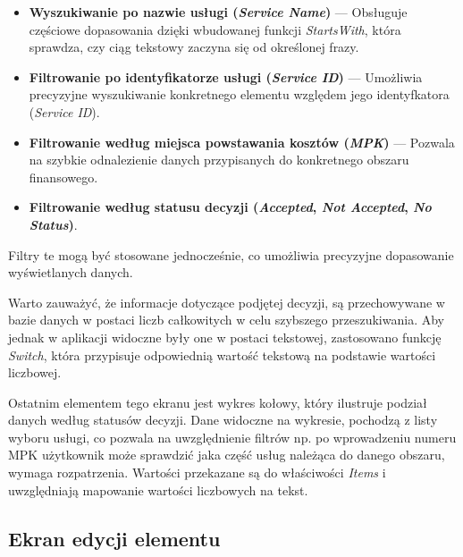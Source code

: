 \begin{itemize}
\item \textbf{Wyszukiwanie po nazwie usługi (\emph{Service Name})} — Obsługuje częściowe dopasowania dzięki wbudowanej funkcji \emph{StartsWith}, która sprawdza, czy ciąg tekstowy zaczyna się od określonej frazy.
\item \textbf{Filtrowanie po identyfikatorze usługi (\emph{Service ID})} — Umożliwia precyzyjne wyszukiwanie konkretnego elementu względem jego identyfkatora (\emph{Service ID}).
\item \textbf{Filtrowanie według miejsca powstawania kosztów (\emph{MPK})} — Pozwala na szybkie odnalezienie danych przypisanych do konkretnego obszaru finansowego.
\item \textbf{Filtrowanie według statusu decyzji (\emph{Accepted}, \emph{Not Accepted}, \emph{No Status})}.
\end{itemize}

Filtry te mogą być stosowane jednocześnie, co umożliwia precyzyjne dopasowanie wyświetlanych danych.

Warto zauważyć, że informacje dotyczące podjętej decyzji, są przechowywane w bazie danych w postaci liczb całkowitych w celu szybszego przeszukiwania. Aby jednak w aplikacji widoczne były one w postaci tekstowej, zastosowano funkcję \emph{Switch}, która przypisuje odpowiednią wartość tekstową na podstawie wartości liczbowej. 
\\
\par
Ostatnim elementem tego ekranu jest wykres kołowy, który ilustruje podział danych według statusów decyzji.
Dane widoczne na wykresie, pochodzą z listy wyboru usługi, co pozwala na uwzględnienie filtrów np. po wprowadzeniu numeru MPK użytkownik może sprawdzić jaka część usług należąca do danego obszaru, wymaga rozpatrzenia. Wartości przekazane są do właściwości \emph{Items} i uwzględniają mapowanie wartości liczbowych na tekst. 


\subsection{Ekran edycji elementu}

